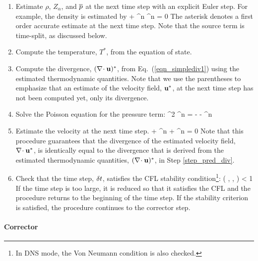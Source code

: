\begin{enumerate}
\item Estimate $\rho$, $Z_\alpha$, and $\overline{p}$ at the next time step with an explicit Euler step. For
example, the density is estimated by
\be {} + \nabla\!\cdot \rho^n \bu^n = 0 \ee
The asterisk denotes a first order accurate estimate at the next time step.  Note that the source term is time-split, as discussed below.

\item Compute the temperature, $T^*$, from the equation of state.

\item \label{step_pred_div} Compute the divergence, $(\nabla\!\cdot {\bf u})^*$, from Eq.~(\ref{eqn_simplediv1}) using the estimated thermodynamic quantities. Note that we use the parentheses to emphasize that an estimate of the velocity field, ${\bf u}^*$, at the next time step has not been computed yet, only its divergence.

\item Solve the Poisson equation for the pressure term:
\be \nabla^2 \cH^n = -  - \nabla\!\cdot \bF^n \ee

\item Estimate the velocity at the next time step.
\be
{} +  \bF^n + ^n = 0
\ee
Note that this procedure guarantees that the divergence of the estimated velocity field, $\nabla\!\cdot {\bf u}^*$, is identically
equal to the divergence that is derived from the estimated thermodynamic quantities, $(\nabla\!\cdot {\bf u})^*$, in Step \ref{step_pred_div}.

\item Check that the time step, $\delta t$, satisfies the CFL stability condition\footnote{In DNS mode, the Von Neumann condition is also checked.}:
\be \dt \; \max\left( , ,  \right) < 1 \quad \ee
If the time step is too large, it is reduced so that it satisfies
the CFL and the procedure returns to the beginning of the time step.
If the stability criterion is satisfied, the procedure continues to the corrector step.
\end{enumerate}

\paragraph{Corrector}

